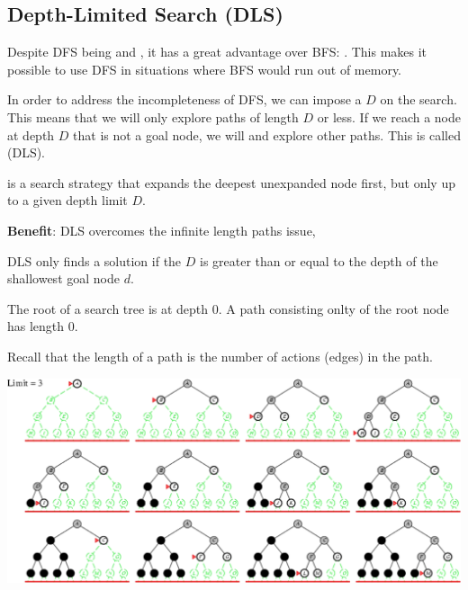 \subsection{Depth-Limited Search (DLS)}

Despite DFS being  and , it has a great advantage over BFS: . This makes it possible to use DFS in situations where BFS would run out of memory. 

In order to address the incompleteness of DFS, we can impose a  $D$ on the search. This means that we will only explore paths of length $D$ or less. If we reach a node at depth $D$ that is not a goal node, we will  and explore other paths. This is called  (DLS).

\begin{definition}\label{def:dls}
     is a search strategy that expands the deepest unexpanded node first, but only up to a given depth limit $D$.
\end{definition}

\begin{listu}
    \item {\color{darkGreen}\textbf{Benefit}:} DLS overcomes the infinite length paths issue, 
    \item {} DLS only finds a solution if the  $D$ is greater than or equal to the depth of the shallowest goal node $d$. 
\end{listu}

\begin{remark}
    The root of a search tree is at depth 0. A path consisting onlty of the root node has length 0.

    Recall that the length of a path is the number of actions (edges) in the path. 
\end{remark}

\begin{center}
    \includegraphics[width=0.67\linewidth]{figures/ids-limit-3.png}
\end{center}

